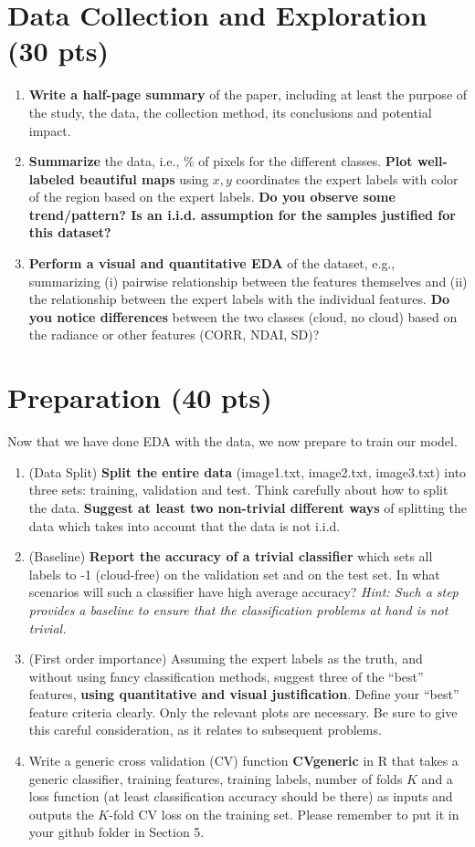 \documentclass[11pt]{article}\usepackage[]{graphicx}\usepackage[]{color}
\begin{document}
\section{Data Collection and Exploration (30 pts)}
\begin{enumerate}[label=(\alph*)]
\item \textbf{Write a half-page summary} of the paper, including at least
the purpose of the study, the data, the collection method, its conclusions
and potential impact.
\item \textbf{Summarize} the data, i.e., $\%$ of pixels for the different
classes. \textbf{Plot well-labeled beautiful maps} using $x, y$ coordinates
the expert labels with color of the region based on the expert labels.
\textbf{Do you observe some trend/pattern? Is an i.i.d. assumption for
the samples justified for this dataset?}
\item \textbf{Perform a visual and quantitative EDA} of the dataset, e.g.,
summarizing (i) pairwise relationship between the features themselves and
(ii) the relationship between the expert labels with the individual features.
\textbf{Do you notice differences} between the two classes (cloud, no cloud)
based on the radiance or other features (CORR, NDAI, SD)?
\end{enumerate}

\section{Preparation (40 pts)}
Now that we have done EDA with the data, we now prepare to train our model.
\begin{enumerate}[label=(\alph*)]
\item (Data Split) \textbf{Split the entire data} (image1.txt, image2.txt,
image3.txt) into three sets: training,  validation and test. Think carefully
about how to split the data. \textbf{Suggest at least two non-trivial different
ways} of splitting the data which takes into account that the data is not i.i.d.
\item (Baseline) \textbf{Report the accuracy of a trivial classifier} which
sets all labels to -1 (cloud-free) on the validation set and on the test set. 
In what scenarios will such a classifier have high average accuracy?
\emph{Hint: Such a step provides a baseline to ensure that the classification
problems at hand is not trivial.}
\item (First order importance) Assuming the expert labels as the
truth, and without using fancy classification methods, suggest
three of the ``best'' features, \textbf{using quantitative and visual justification}. Define your ``best'' feature criteria clearly. Only the relevant plots are necessary. Be sure to give this careful consideration, as it relates to subsequent problems.
\item Write a generic cross validation (CV) function \textbf{CVgeneric} in R that takes a generic classifier, training features, training labels, number of folds $K$ and a loss function (at least classification accuracy should be there) as inputs and outputs the $K$-fold CV loss on the training set.  Please remember to put it in your github folder in Section 5.
\end{enumerate}
\end{document}
